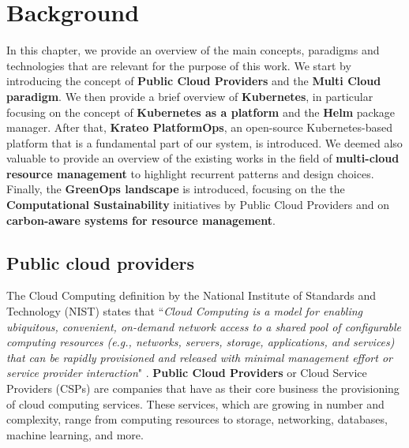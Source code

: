 \chapter{Background}
\label{cha:background}

In this chapter, we provide an overview of the main concepts, paradigms and technologies that are relevant for the purpose of this work.
We start by introducing the concept of \textbf{Public Cloud Providers} and the \textbf{Multi Cloud paradigm}.
We then provide a brief overview of \textbf{Kubernetes}, in particular focusing on the concept of \textbf{Kubernetes as a platform} and the \textbf{Helm} package manager.
After that, \textbf{Krateo PlatformOps}, an open-source Kubernetes-based platform that is a fundamental part of our system, is introduced.
We deemed also valuable to provide an overview of the existing works in the field of \textbf{multi-cloud resource management} to highlight recurrent patterns and design choices.
Finally, the \textbf{GreenOps landscape} is introduced, focusing on the the \textbf{Computational Sustainability} initiatives by Public Cloud Providers and on \textbf{carbon-aware systems for resource management}. 

\section{Public cloud providers}

The Cloud Computing definition by the National Institute of Standards and Technology (NIST) \cite{nist} states that ``\textit{Cloud Computing is a model for enabling ubiquitous, convenient, on-demand network access to a shared pool of configurable computing resources (e.g., networks, servers, storage, applications, and services) that can be rapidly provisioned and released with minimal management effort or service provider interaction}" \cite{nist}.
\textbf{Public Cloud Providers} or Cloud Service Providers (CSPs) are companies that have as their core business the provisioning of cloud computing services. These services, which are growing in number and complexity, range from computing resources to storage, networking, databases, machine learning, and more. 




